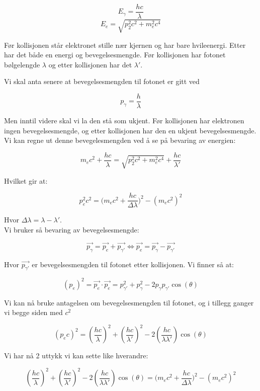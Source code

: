 \documentclass[a4paper,norsk, 10pt]{article}
\begin{document}
$$
E_{\gamma} = \frac{hc}{\lambda}
$$
$$
E_e = \sqrt{p_2^2c^2 + m_e^2c^4}
$$

Før kollisjonen står elektronet stille nær kjernen og har bare hvileenergi. Etter har det både en energi og bevegelsesmengde. Før kollisjonen har fotonet bølgelengde $\lambda$ og etter kollisjonen har det $\lambda'$.

Vi skal anta senere at bevegelsesmengden til fotonet er gitt ved

$$
p_{\gamma} = \frac{h}{\lambda}
$$

Men inntil videre skal vi la den stå som ukjent. Før kollisjonen har elektronen ingen bevegelsesmengde, og etter kollisjonen har den en ukjent bevegelsesmengde. Vi kan regne ut denne bevegelesmengden ved å se på bevaring av energien:

$$
m_ec^2 + \frac{hc}{\lambda} = \sqrt{p_2^2c^2 + m_e^2c^4} + \frac{hc}{\lambda'}
$$

Hvilket gir at:

\begin{equation}
p_e^2c^2 = \big(m_ec^2 + \frac{hc}{\Delta \lambda} \big)^2 - (m_ec^2)^2
\end{equation}\label{eq::p2c2}

Hvor $\Delta \lambda = \lambda - \lambda'$.\\

Vi bruker så bevaring av bevegelsesmengde:

$$
\vec{p_{\gamma}} = \vec{p_e} + \vec{p_{\gamma'}} \Leftrightarrow \vec{p_{e}} = \vec{p_{\gamma}} - \vec{p_{\gamma'}}
$$

Hvor $\vec{p_{\gamma'}}$ er bevegelsesmengden til fotonet etter kollisjonen. Vi finner så at:

$$
(p_e)^2 = \vec{p_e} \cdot \vec{p_e} = p_{\gamma'}^2 + p_{\gamma}^2 - 2p_{\gamma}p_{\gamma'}\cos(\theta)
$$

Vi kan nå bruke antagelsen om bevegelsesmengden til fotonet, og i tillegg ganger vi begge siden med $c^2$

\begin{equation}
(p_ec)^2 = \left(\frac{hc}{\lambda}\right)^2 + \left(\frac{hc}{\lambda'}\right)^2 - 2\left(\frac{hc}{\lambda \lambda'}\right)\cos(\theta)
\end{equation}\label{eq::p2c22}

Vi har nå 2 uttykk vi kan sette like hverandre:

$$
\left(\frac{hc}{\lambda}\right)^2 + \left(\frac{hc}{\lambda'}\right)^2 - 2\left(\frac{hc}{\lambda \lambda'}\right)\cos(\theta) = \big(m_ec^2 + \frac{hc}{\Delta \lambda} \big)^2 - (m_ec^2)^2
$$
\end{document}
